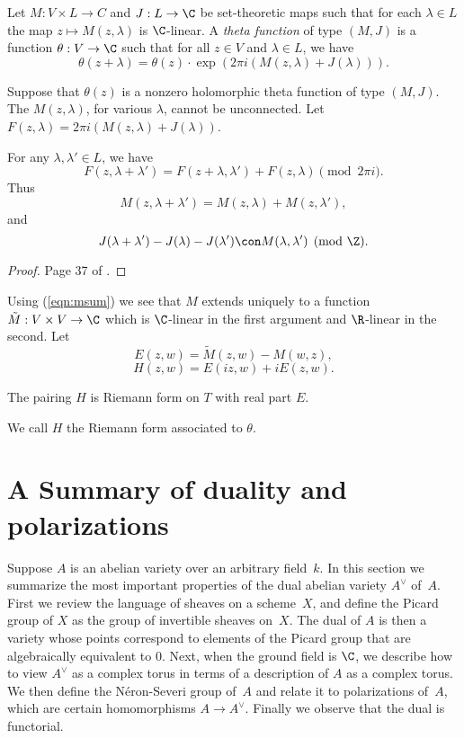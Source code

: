 \documentclass{report}
\begin{document}
\begin{definition}
Let $M:V\times L \to C$ and $J:L\to \C$ be set-theoretic maps such
that for each $\lambda\in L$ the map $z\mapsto M(z,\lambda)$ is
$\C$-linear.  A {\em theta function} of type $(M,J)$ is a function
$\theta:V\to \C$ such that for all $z\in V$ and $\lambda\in L$, we
have
\[
  \theta(z+\lambda) = \theta(z)\cdot \exp(2\pi i(
  M(z,\lambda)+J(\lambda))).
\]
\end{definition}
Suppose that $\theta(z)$ is a nonzero holomorphic theta function
of type $(M,J)$.  The $M(z,\lambda)$, for various $\lambda$,
cannot be unconnected.  Let $F(z,\lambda)=2\pi
i(M(z,\lambda)+J(\lambda))$.
\begin{lemma}
For any $\lambda, \lambda'\in L$, we have
\[
 F(z,\lambda+\lambda') =
 F(z+\lambda,\lambda')+F(z,\lambda)\pmod{2\pi i}.
\]
Thus
\begin{equation}\label{eqn:msum}
  M(z,\lambda+\lambda') = M(z,\lambda) + M(z,\lambda'),
\end{equation}
and
\[
 J(\lambda+\lambda') - J(\lambda) - J(\lambda') \con
 M(\lambda,\lambda')\pmod{\Z}.
\]
\end{lemma}
\begin{proof}
Page 37 of \cite{swinnerton-dyer:abvars}.
\end{proof}
Using (\ref{eqn:msum}) we see that $M$ extends uniquely to a
function $\tilde{M}:V\times V\to\C$ which is $\C$-linear in the
first argument and $\R$-linear in the second.  Let
\[
  E(z,w) = \tilde{M}(z,w) - M(w,z),
\]
\[
  H(z,w) = E(iz,w) + iE(z,w).
\]
\begin{proposition}
The pairing $H$ is Riemann form on $T$ with real part $E$.
\end{proposition}
We call $H$ the Riemann form associated to $\theta$.

\section{A Summary of duality and polarizations}%
Suppose $A$ is an abelian variety over an arbitrary field~$k$.  In
this section we summarize the most important properties of the
dual abelian variety $A^{\vee}$ of~$A$.  First we review the
language of sheaves on a scheme~$X$, and define the Picard group
of $X$ as the group of invertible sheaves on~$X$. The dual of $A$
is then a variety whose points correspond to elements of the
Picard group that are algebraically equivalent to $0$. Next, when
the ground field is $\C$, we describe how to view $A^{\vee}$ as a
complex torus in terms of a description of $A$ as a complex torus.
We then define the N\'eron-Severi group of~$A$ and relate it to
polarizations of~$A$, which are certain homomorphisms $A\to
A^{\vee}$.  Finally we observe that the dual is functorial.
\end{document}
